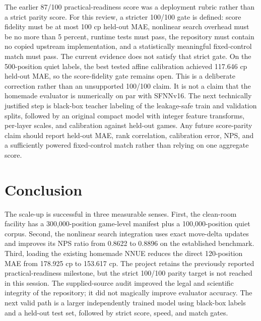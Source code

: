 \documentclass[conference]{IEEEtran}
\begin{document}
The earlier 87/100 practical-readiness score was a deployment rubric rather than a strict parity score. For this review, a stricter 100/100 gate is defined: score fidelity must be at most 100 cp held-out MAE, nonlinear search overhead must be no more than 5 percent, runtime tests must pass, the repository must contain no copied upstream implementation, and a statistically meaningful fixed-control match must pass. The current evidence does not satisfy that strict gate. On the 500-position quiet labels, the best tested affine calibration achieved 117.646 cp held-out MAE, so the score-fidelity gate remains open. This is a deliberate correction rather than an unsupported 100/100 claim. It is not a claim that the homemade evaluator is numerically on par with SFNNv16. The next technically justified step is black-box teacher labeling of the leakage-safe train and validation splits, followed by an original compact model with integer feature transforms, per-layer scales, and calibration against held-out games. Any future score-parity claim should report held-out MAE, rank correlation, calibration error, NPS, and a sufficiently powered fixed-control match rather than relying on one aggregate score.

\section{Conclusion}
The scale-up is successful in three measurable senses. First, the clean-room facility has a 300,000-position game-level manifest plus a 100,000-position quiet corpus. Second, the nonlinear search integration uses exact move-delta updates and improves its NPS ratio from 0.8622 to 0.8896 on the established benchmark. Third, loading the existing homemade NNUE reduces the direct 120-position MAE from 178.925 cp to 153.617 cp. The project retains the previously reported practical-readiness milestone, but the strict 100/100 parity target is not reached in this session. The supplied-source audit improved the legal and scientific integrity of the repository; it did not magically improve evaluator accuracy. The next valid path is a larger independently trained model using black-box labels and a held-out test set, followed by strict score, speed, and match gates.
\end{document}
